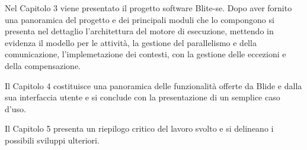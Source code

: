 Nel Capitolo 3 viene presentato il progetto software Blite-se. Dopo aver
fornito una panoramica del progetto e dei principali moduli che lo compongono si
presenta nel dettaglio l'architettura del motore di esecuzione, mettendo in
evidenza il modello per le attività, la gestione del parallelismo e della
comunicazione, l'implemetazione dei contesti, con la gestione delle
eccezioni e della compensazione.

Il Capitolo 4 costituisce una panoramica delle funzionalità offerte da Blide e
dalla sua interfaccia utente e si conclude con la presentazione di un semplice
caso d'uso. 

Il Capitolo 5 presenta un riepilogo critico del lavoro svolto e si delineano i
possibili sviluppi ulteriori.
